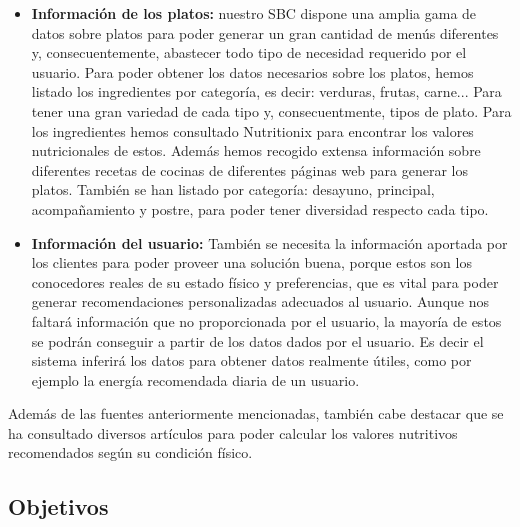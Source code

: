 \documentclass[11pt]{article}
\begin{document}
\begin{itemize}
    \item \textbf{Información de los platos:} nuestro SBC dispone una amplia gama de datos sobre platos para poder generar un gran cantidad de menús diferentes y, consecuentemente, abastecer todo tipo de necesidad requerido por el usuario. Para poder obtener los datos necesarios sobre los platos, hemos listado los ingredientes por categoría, es decir: verduras, frutas, carne... Para tener una gran variedad de cada tipo y, consecuentmente, tipos de plato. Para los ingredientes hemos consultado Nutritionix para encontrar los valores nutricionales de estos.
    Además hemos recogido extensa información sobre diferentes recetas de cocinas de diferentes páginas web para generar los platos. También se han listado por categoría: desayuno, principal, acompañamiento y postre, para poder tener diversidad respecto cada tipo.
    \item \textbf{Información del usuario:} También se necesita la información aportada por los clientes para poder proveer una solución buena, porque estos son los conocedores reales de su estado físico y preferencias, que es vital para poder generar recomendaciones personalizadas adecuados al usuario. Aunque nos faltará información que no proporcionada por el usuario, la mayoría de estos se podrán conseguir a partir de los datos dados por el usuario. Es decir el sistema inferirá los datos para obtener datos realmente útiles, como por ejemplo la energía recomendada diaria de un usuario.
\end{itemize}

Además de las fuentes anteriormente mencionadas, también cabe destacar que se ha consultado diversos artículos para poder calcular los valores nutritivos recomendados según su condición físico.

\subsection{Objetivos}
\end{document}
